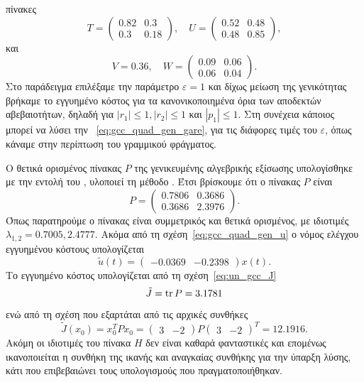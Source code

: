 πίνακες
\[
    T =
    \begin{pmatrix}
        0.82 & 0.3 \\
        0.3 & 0.18
    \end{pmatrix},\quad
    U =
    \begin{pmatrix}
        0.52 & 0.48 \\
        0.48 & 0.85
    \end{pmatrix},
\]
και
\[
    V = 0.36,\quad
    W =
    \begin{pmatrix}
        0.09 & 0.06 \\
        0.06 & 0.04
    \end{pmatrix}.
\]
Στο παράδειγμα επιλέξαμε την παράμετρο \( \varepsilon = 1 \) και δίχως μείωση της
γενικότητας βρήκαμε το εγγυημένο κόστος για τα κανονικοποιημένα όρια των αποδεκτών
αβεβαιοτήτων, δηλαδή για
\( |r_1| \leq 1 , |r_2| \leq 1 \) και \( |p_1| \leq 1 \). Στη συνέχεια κάποιος
μπορεί να λύσει την ~\eqref{eq:gcc_quad_gen_gare}, για τις διάφορες
τιμές του \( \varepsilon \), όπως κάναμε στην περίπτωση του γραμμικού φράγματος.

Ο θετικά ορισμένος πίνακας \( P \) της γενικευμένης αλγεβρικής εξίσωσης
 υπολογίσθηκε με την εντολή  του , υλοποιεί
τη μέθοδο . Έτσι βρίσκουμε ότι ο πίνακας \( P \) είναι
\[
    P =
    \begin{pmatrix}
        0.7806 & 0.3686 \\
        0.3686 & 2.3976
    \end{pmatrix}.
\]
Όπως παρατηρούμε ο πίνακας είναι συμμετρικός και θετικά ορισμένος, με ιδιοτιμές
\( \lambda_{1,2} = 0.7005, 2.4777 \). Ακόμα από τη σχέση~\eqref{eq:gcc_quad_gen_u}
ο νόμος ελέγχου εγγυημένου κόστους υπολογίζεται
\[
    \tilde{u}(t) =
    \begin{pmatrix}
        -0.0369 & -0.2398
    \end{pmatrix}x(t).
\]
Το εγγυημένο κόστος υπολογίζεται από τη σχέση~\eqref{eq:un_gcc_J}
\[
   \tilde{J} = \operatorname{tr}{P} = 3.1781
\]
ενώ από τη σχέση που εξαρτάται από τις αρχικές συνθήκες
\[
    \tilde{J}(x_0) = x_0^{T}Px_0 =
    \begin{pmatrix}
        3 & -2
    \end{pmatrix}P
    \begin{pmatrix}
        3 & -2
    \end{pmatrix}^T = 12.1916.
\]
Ακόμη οι ιδιοτιμές του πίνακα \( H \) δεν είναι καθαρά φανταστικές και επομένως
ικανοποιείται η συνθήκη της ικανής και αναγκαίας συνθήκης για την ύπαρξη λύσης,
κάτι που επιβεβαιώνει τους υπολογισμούς που πραγματοποιήθηκαν.

